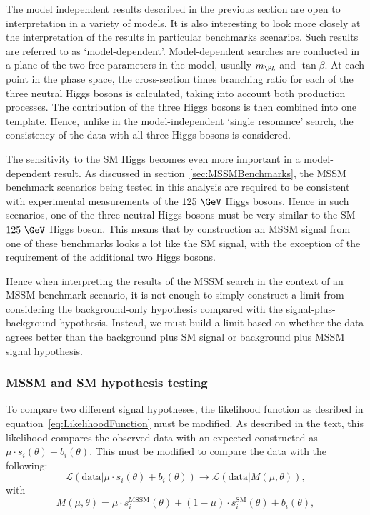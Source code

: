 The model independent results described in the previous section are open to
interpretation in a variety of models. It is also interesting to look more
closely at the interpretation of the results in particular benchmarks scenarios.
Such results are referred to as `model-dependent'. Model-dependent searches are
conducted in a plane of the two free parameters in the model, usually $m_{\PA}$
and $\tan\beta$. At each point in the phase space, the cross-section times
branching ratio for each of the three neutral Higgs bosons is calculated, taking
into account both production processes. The contribution of the three Higgs
bosons is then combined into one template. Hence, unlike in the
model-independent `single resonance' search, the consistency of the data with
all three Higgs bosons is considered. 

The sensitivity to the \ac{SM} Higgs becomes even more important in a
model-dependent result. As discussed in
section~\ref{sec:MSSMBenchmarks}, the \ac{MSSM} benchmark scenarios being tested in this
analysis are required to be consistent with experimental measurements of the
$125~\GeV$ Higgs bosons. Hence in such scenarios, one of the three neutral Higgs
bosons must be very similar to the \ac{SM} $125~\GeV$ Higgs boson. This means
that by construction an \ac{MSSM} signal from one of these benchmarks looks a
lot like the \ac{SM} signal, with the exception of the requirement of the
additional two Higgs bosons.

Hence when interpreting the results of the \ac{MSSM} search in the context of an
\ac{MSSM} benchmark scenario, it is not enough to simply construct a limit from
considering the background-only hypothesis compared with the
signal-plus-background hypothesis. Instead, we must build a limit based on
whether the data agrees better than the background plus \ac{SM} signal or
background plus \ac{MSSM} signal hypothesis.

\subsubsection{\ac{MSSM} and \ac{SM} hypothesis testing}

To compare two different signal hypotheses, the likelihood function as desribed
in equation~\ref{eq:LikelihoodFunction} must be modified. As described in the
text, this likelihood compares the observed data with an expected constructed as
$\mu \cdot s_{i}(\theta) + b_{i}(\theta)$. This must be modified to compare the data with the
following:
\begin{equation}
\mathcal{L}(\text{data} | \mu \cdot s_{i}(\theta) + b_{i}(\theta)) \rightarrow
\mathcal{L}(\text{data}|M(\mu,\theta)),
\end{equation}
with
\begin{equation}
M(\mu,\theta) = \mu \cdot s_{i}^{\text{MSSM}}(\theta) + (1-\mu) \cdot
s_{i}^{\text{SM}}(\theta) + b_{i}(\theta), 
\end{equation}

